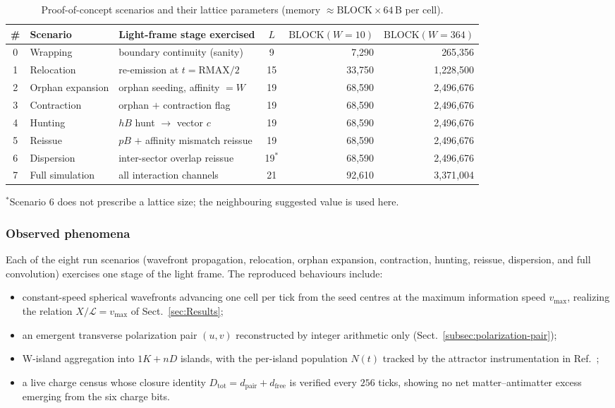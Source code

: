 \documentclass{ijuc}
\begin{document}
\begin{table}[h]
\centering
\caption{Proof-of-concept scenarios and their lattice parameters (memory $\approx\mathrm{BLOCK}\times64$\,B per cell).}
\label{tab:scenarios}
\begin{tabular}{|c|l|l|c|r|r|}
\hline
\# & Scenario & Light-frame stage exercised & $L$ & $\mathrm{BLOCK}(W{=}10)$ & $\mathrm{BLOCK}(W{=}364)$\\
\hline
0 & Wrapping & boundary continuity (sanity) & 9 & 7{,}290 & 265{,}356\\
1 & Relocation & re-emission at $t=\mathrm{RMAX}/2$ & 15 & 33{,}750 & 1{,}228{,}500\\
2 & Orphan expansion & orphan seeding, affinity $=W$ & 19 & 68{,}590 & 2{,}496{,}676\\
3 & Contraction & orphan $+$ contraction flag & 19 & 68{,}590 & 2{,}496{,}676\\
4 & Hunting & $hB$ hunt $\rightarrow$ vector $c$ & 19 & 68{,}590 & 2{,}496{,}676\\
5 & Reissue & $pB$ $+$ affinity mismatch reissue & 19 & 68{,}590 & 2{,}496{,}676\\
6 & Dispersion & inter-sector overlap reissue & 19$^{*}$ & 68{,}590 & 2{,}496{,}676\\
7 & Full simulation & all interaction channels & 21 & 92{,}610 & 3{,}371{,}004\\
\hline
\end{tabular}

{\small $^{*}$Scenario 6 does not prescribe a lattice size; the neighbouring suggested value is used here.}
\end{table}

\subsubsection{Observed phenomena}

Each of the eight run scenarios (wavefront propagation, relocation, orphan expansion, contraction, hunting, reissue, dispersion, and full convolution) exercises one stage of the light frame.  The reproduced behaviours include:
\begin{itemize}
  \item constant-speed spherical wavefronts advancing one cell per tick from the seed centres at the maximum information speed $v_{\max}$, realizing the relation $X/\mathcal{L}=v_{\max}$ of Sect.~\ref{sec:Results};
  \item an emergent transverse polarization pair $(u,v)$ reconstructed by integer arithmetic only (Sect.~\ref{subsec:polarization-pair});
  \item W-island aggregation into $1K+nD$ islands, with the per-island population $N(t)$ tracked by the attractor instrumentation in Ref.~\cite{af_neto};
  \item a live charge census whose closure identity $D_{\mathrm{tot}}=d_{\mathrm{pair}}+d_{\mathrm{free}}$ is verified every $256$ ticks, showing no net matter--antimatter excess emerging from the six charge bits.
\end{itemize}
\end{document}
